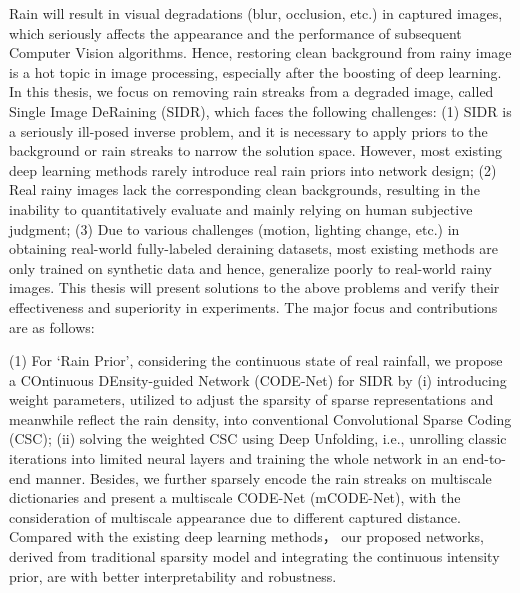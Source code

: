 \begin{center}{\songti{}  \par}\end{center}

\noindent{}



\begin{enabstract}
Rain will result in visual degradations (blur, occlusion, etc.) in captured images, which seriously affects the appearance and the performance of subsequent Computer Vision algorithms. Hence, restoring clean background from rainy image is a hot topic in image processing, especially after the boosting of deep learning. In this thesis, we focus on removing rain streaks from a degraded image, called Single Image DeRaining (SIDR), which faces the following challenges: (1) SIDR is a seriously ill-posed inverse problem, and it is necessary to apply priors to the background or rain streaks to narrow the solution space. However, most existing deep learning methods rarely introduce real rain priors into network design; (2) Real rainy images lack the corresponding clean backgrounds, resulting in the inability to quantitatively evaluate and mainly relying on human subjective judgment; (3) Due to various challenges (motion, lighting change, etc.) in obtaining real-world fully-labeled deraining datasets, most existing methods are only trained on synthetic data and hence, generalize poorly to real-world rainy images. This thesis will present solutions to the above problems and verify their effectiveness and superiority in experiments. The major focus and contributions are as follows:

(1) For `Rain Prior', considering the continuous state of real rainfall, we propose a COntinuous DEnsity-guided Network (CODE-Net) for SIDR by (i) introducing weight parameters, utilized to adjust the sparsity of sparse representations and meanwhile reflect the rain density, into conventional Convolutional Sparse Coding (CSC); (ii) solving the weighted CSC using Deep Unfolding, i.e., unrolling classic iterations into limited neural layers and training the whole network in an end-to-end manner. Besides, we further sparsely encode the rain streaks on multiscale dictionaries and present a multiscale CODE-Net (mCODE-Net), with the consideration of multiscale appearance due to different captured distance. Compared with the existing deep learning methods， our proposed networks, derived from traditional sparsity model and integrating the continuous intensity prior, are with better interpretability and robustness.


\end{enabstract}
